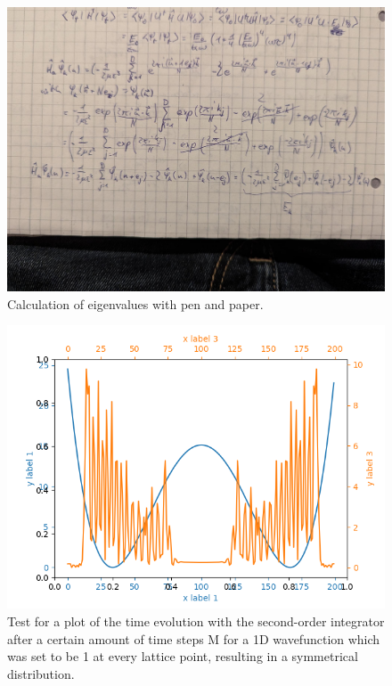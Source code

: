 \documentclass[11pt, letterpaper, onecolumn]{article}
\begin{document}
	\begin{figure} [h] 
	\begin{center}
	\includegraphics[width=16cm]{"calc.jpeg"}
	\caption{Calculation of eigenvalues with pen and paper.}
		\label{fig:calc-eigenvalues}
	\end{center}
	\end{figure}
	
	
	\begin{figure} [h] 
	\begin{center}
	\includegraphics[width=16cm]{"animation-so-integratorEND.png
"}
	\caption{Test for a plot of the time evolution with the second-order integrator after a certain amount of time steps M for a 1D wavefunction which was set to be 1 at every lattice point, resulting in a symmetrical distribution.}
		\label{fig:1D-so_integr}
	\end{center}
	\end{figure}
    
	


	

	
	





	
\end{document}
